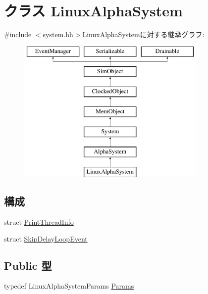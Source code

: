 \hypertarget{classLinuxAlphaSystem}{
\section{クラス LinuxAlphaSystem}
\label{classLinuxAlphaSystem}
}


{\ttfamily \#include $<$system.hh$>$}LinuxAlphaSystemに対する継承グラフ:\begin{figure}[H]
\begin{center}
\leavevmode
\includegraphics[height=7cm]{classLinuxAlphaSystem}
\end{center}
\end{figure}
\subsection*{構成}
\begin{DoxyCompactItemize}
\item 
struct \hyperlink{structLinuxAlphaSystem_1_1PrintThreadInfo}{PrintThreadInfo}
\item 
struct \hyperlink{structLinuxAlphaSystem_1_1SkipDelayLoopEvent}{SkipDelayLoopEvent}
\end{DoxyCompactItemize}
\subsection*{Public 型}
\begin{DoxyCompactItemize}
\item 
typedef LinuxAlphaSystemParams \hyperlink{classLinuxAlphaSystem_a0d8e2379ed014b6039c45eb98c24fed4}{Params}
\end{DoxyCompactItemize}
